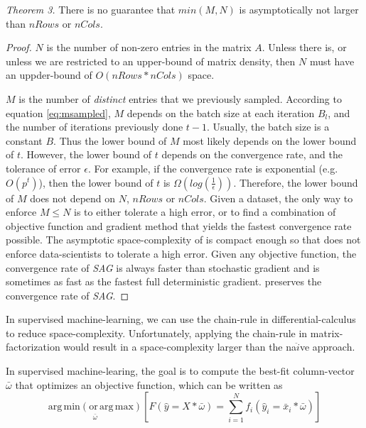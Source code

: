 \emph{Theorem 3.}  
There is no guarantee that $min(M,N)$ is asymptotically not larger than $nRows$ or $nCols$.
\begin{proof}
$N$ is the number of non-zero entries in the matrix $A$.
Unless there is, or unless we are restricted to an upper-bound of matrix density, then $N$ must have an uppder-bound of $O(nRows*nCols)$ space.

$M$ is the number of \emph{distinct} entries that we previously sampled.
According to equation \ref{eq:msampled}, $M$ depends on the batch size at each iteration $B_l$, and the number of iterations previously done $t-1$.
Usually, the batch size is a constant $B$.  Thus the lower bound of $M$ most likely depends on the lower bound of $t$.
However, the lower bound of $t$ depends on the convergence rate, and the tolerance of error $\epsilon$.
For example, if the convergence rate is exponential (e.g. $O(p^t)$), then the lower bound of $t$ is $\Omega(log(\frac{1}{\epsilon}))$.
Therefore, the lower bound of $M$ does not depend on $N$, $nRows$ or $nCols$.
Given a dataset, the only way to enforce $M \leq N$ is to either tolerate a high error, or to find a combination of objective function and gradient method that yields the fastest convergence rate  possible.
The asymptotic space-complexity of \tool is compact enough so that \tool does not enforce data-scientists to tolerate a high error.
Given any objective function, the convergence rate of \emph{SAG} \cite{schmidt2013minimizing, roux2012stochastic} is always faster than stochastic gradient and is sometimes as fast as the fastest full deterministic gradient.
\tool preserves the convergence rate of \emph{SAG}.
\end{proof}


In supervised machine-learning, we can use the chain-rule in differential-calculus to reduce space-complexity.
Unfortunately, applying the chain-rule in matrix-factorization would result in a space-complexity larger than the na$\ddot{i}$ve approach.

In supervised machine-learing, the goal is to compute the best-fit column-vector $\bar{\omega}$ that optimizes an objective function, which can be written as
\begin{equation} \label{eq:sml}
\operatorname*{arg\,min (or\,arg\,max)}_{\bar{\omega}} \left[F(\hat{y} = X*\bar{\omega}) = \sum_{i=1}^{N} f_{i}(\hat{y}_{i} = \bar{x}_{i}*\bar{\omega}) \right]
\end{equation}

